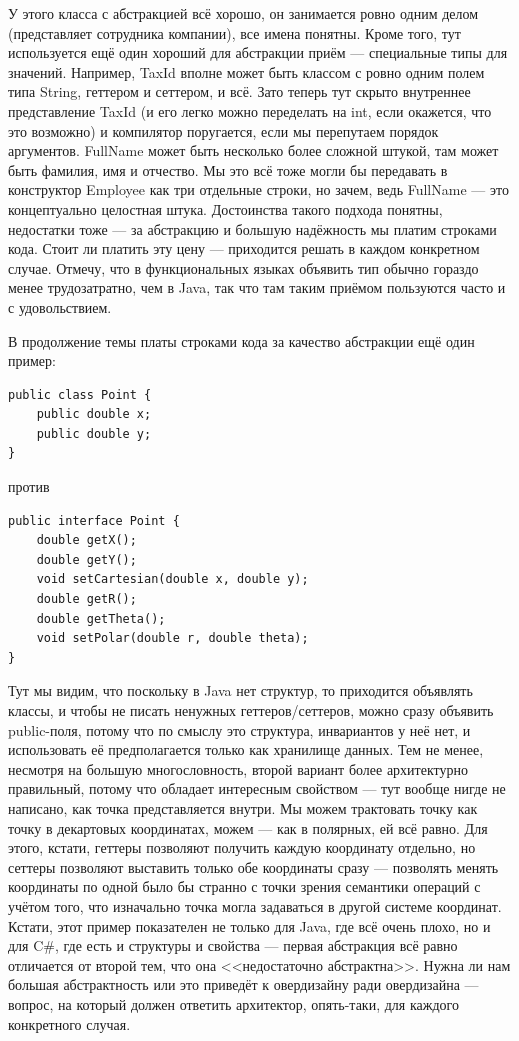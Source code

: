 \documentclass{../../text-style}
\begin{document}
У этого класса с абстракцией всё хорошо, он занимается ровно одним делом (представляет сотрудника компании), все имена понятны. Кроме того, тут используется ещё один хороший для абстракции приём --- специальные типы для значений. Например, TaxId вполне может быть классом с ровно одним полем типа String, геттером и сеттером, и всё. Зато теперь тут скрыто внутреннее представление TaxId (и его легко можно переделать на int, если окажется, что это возможно) и компилятор поругается, если мы перепутаем порядок аргументов. FullName может быть несколько более сложной штукой, там может быть фамилия, имя и отчество. Мы это всё тоже могли бы передавать в конструктор Employee как три отдельные строки, но зачем, ведь FullName --- это концептуально целостная штука. Достоинства такого подхода понятны, недостатки тоже --- за абстракцию и большую надёжность мы платим строками кода. Стоит ли платить эту цену --- приходится решать в каждом конкретном случае. Отмечу, что в функциональных языках объявить тип обычно гораздо менее трудозатратно, чем в Java, так что там таким приёмом пользуются часто и с удовольствием.

В продолжение темы платы строками кода за качество абстракции ещё один пример:

\begin{verbatim}
public class Point {
    public double x;
    public double y;
}
\end{verbatim}

против

\begin{verbatim}
public interface Point {
    double getX();
    double getY();
    void setCartesian(double x, double y);
    double getR();
    double getTheta();
    void setPolar(double r, double theta);
}
\end{verbatim}

Тут мы видим, что поскольку в Java нет структур, то приходится объявлять классы, и чтобы не писать ненужных геттеров/сеттеров, можно сразу объявить public-поля, потому что по смыслу это структура, инвариантов у неё нет, и использовать её предполагается только как хранилище данных. Тем не менее, несмотря на большую многословность, второй вариант более архитектурно правильный, потому что обладает интересным свойством --- тут вообще нигде не написано, как точка представляется внутри. Мы можем трактовать точку как точку в декартовых координатах, можем --- как в полярных, ей всё равно. Для этого, кстати, геттеры позволяют получить каждую координату отдельно, но сеттеры позволяют выставить только обе координаты сразу --- позволять менять координаты по одной было бы странно с точки зрения семантики операций с учётом того, что изначально точка могла задаваться в другой системе координат. Кстати, этот пример показателен не только для Java, где всё очень плохо, но и для C\#, где есть и структуры и свойства --- первая абстракция всё равно отличается от второй тем, что она <<недостаточно абстрактна>>. Нужна ли нам большая абстрактность или это приведёт к овердизайну ради овердизайна --- вопрос, на который должен ответить архитектор, опять-таки, для каждого конкретного случая.
\end{document}
